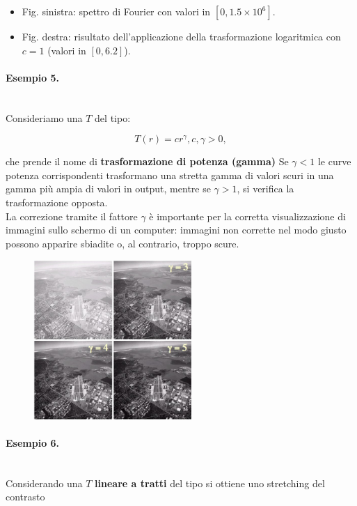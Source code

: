 \begin{itemize}
    \item Fig. sinistra: spettro di Fourier con valori in $[0, 1.5 \times 10^6]$.
    \item Fig. destra: risultato dell'applicazione della trasformazione logaritmica
          con $c = 1$ (valori in $[0, 6.2]$).
\end{itemize}

\paragraph{Esempio 5.}\ \\

Consideriamo una $T$ del tipo:

$$
    T(r) = cr^\gamma, c, \gamma > 0,
$$

che prende il nome di \textbf{trasformazione di potenza (gamma)}
Se $\gamma < 1$ le curve potenza corrispondenti trasformano una stretta
gamma di valori scuri in una gamma più ampia di valori in output,
mentre se $\gamma > 1$, si verifica la trasformazione opposta.\\
La correzione tramite il fattore $\gamma$ è importante per la corretta
visualizzazione di immagini sullo schermo di un computer:
immagini non corrette nel modo giusto possono apparire sbiadite o,
al contrario, troppo scure.

\begin{figure}[H]
    \centering
    \includegraphics[width=6cm, keepaspectratio]{capitoli/immagini/imgs/foto_esempio_5.jpg}
\end{figure}

\paragraph{Esempio 6.}\ \\

Considerando una $T$ \textbf{lineare a tratti} del tipo si ottiene uno
stretching del contrasto

